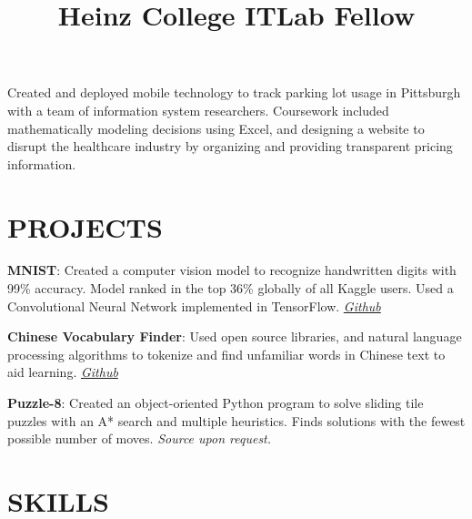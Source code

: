 \documentclass[margin]{res}
\begin{document}
\begin{resume}
\title{\textbf{Heinz College ITLab Fellow}}
\begin{position}
Created and deployed mobile technology to track parking lot usage in Pittsburgh with a team of information system researchers. Coursework included mathematically modeling decisions using Excel, and designing a website to disrupt the healthcare industry by organizing and providing transparent pricing information.
\end{position}

\section{PROJECTS}

\par
\textbf{MNIST}:
Created a computer vision model to recognize handwritten digits with 99\% accuracy. Model ranked in the top 36\% globally of all Kaggle users. Used a Convolutional Neural Network implemented in TensorFlow. \textit{\href{https://github.com/lucaskjaero/MNIST}{Github}}

\par
\textbf{Chinese Vocabulary Finder}:
Used open source libraries, and natural language processing algorithms to tokenize and find unfamiliar words in Chinese text to aid learning. \textit{\href{https://github.com/lucaskjaero/Chinese-Vocabulary-Finder}{Github}}
\par
\textbf{Puzzle-8}:
Created an object-oriented Python program to solve sliding tile puzzles with an A* search and multiple heuristics. Finds solutions with the fewest possible number of moves. \textit{Source upon request.}


\section{SKILLS}


\end{resume}
\end{document}
